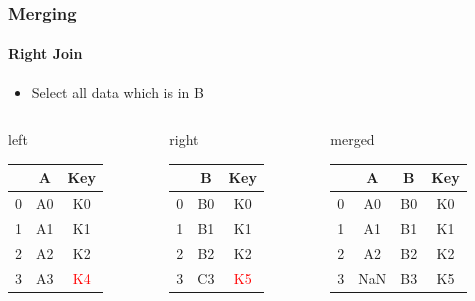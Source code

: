 \documentclass[12pt,ngerman]{beamer}
\def\firstcircle{(0,0) circle (2cm)}
\def\secondcircle{(0:3cm) circle (2cm)}
\begin{document}
\begin{frame}
\frametitle{Merging}
\framesubtitle{Right Join}

\begin{itemize}
\item Select all data which is in B
\end{itemize}

\begin{center}

\end{center}

{\footnotesize
\begin{columns}
\begin{column}{0.3\textwidth}
left \\
\begin{tabular}{c|cc} \toprule
   & A  &  Key \\ \midrule
0 & A0 &  K0 \\
1 & A1 &  K1 \\ 
2 & A2 &  K2 \\
3 & A3 &  \textcolor{red}{K4} \\ \bottomrule
\end{tabular}
\end{column}
\begin{column}{0.3\textwidth}
right \\
\begin{tabular}{c|cc} \toprule
   &  B   & Key \\ \midrule
0 &  B0 & K0 \\
1 &  B1 & K1 \\ 
2 &  B2 & K2 \\
3 &  C3 & \textcolor{red}{K5} \\ \bottomrule
\end{tabular}\end{column}
\begin{column}{0.3\textwidth}
merged \\
\begin{tabular}{c|ccc} \toprule
   & A  & B   & Key \\ \midrule
0 & A0 & B0 & K0 \\
1 & A1 & B1 & K1 \\ 
2 & A2 & B2 & K2 \\ 
3 & NaN & B3 & K5 \\ \bottomrule
\end{tabular} \\
\vspace*{0.4em}
\end{column}
\end{columns}}

\end{frame}
\end{document}

